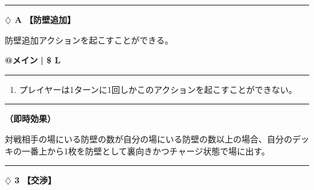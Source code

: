 \documentclass[twocolumn,a5paper,papersize,10pt]{jarticle}
\begin{document}
\vspace{3mm} %
\hrule height 0.5mm depth 0mm width 66.5mm %
\vspace{1mm} %
{\Large\bf $\diamondsuit$ A} {\normalsize\bf【防壁追加】} %
\vspace{1mm} %

防壁追加アクションを起こすことができる。

\begin{tcolorbox}[title={\small\bf【Action】防壁追加}{\scriptsize （通常魔法）}]

{\scriptsize\bf @メイン }
  {\scriptsize\bf | \$ L }

\vspace{1mm} %
\hrule height 0.1mm depth 0mm width 62mm %
\vspace{1mm} %


\vspace{-1zh}%
\begin{enumerate}
\renewcommand{\labelenumi}{※}
\setlength{\leftskip}{-0.3cm}
\setlength{\itemsep}{0pt} %
\setlength{\parskip}{0pt} %

\item プレイヤーは1ターンに1回しかこのアクションを起こすことができない。

\vspace{-3mm}%
\end{enumerate}
\vspace{-2mm} %
\vspace{1zh}%
\vspace{1mm} %
\hrule height 0.1mm depth 0mm width 62mm %
\vspace{1mm} %

{\bf（即時効果）}

対戦相手の場にいる防壁の数が自分の場にいる防壁の数以上の場合、自分のデッキの一番上から1枚を防壁として裏向きかつチャージ状態で場に出す。

\vspace{1mm} %
\end{tcolorbox}

\vspace{-1zh}

 
 
 
 
 

\vspace{3mm} %
\hrule height 0.5mm depth 0mm width 66.5mm %
\vspace{1mm} %
{\Large\bf $\diamondsuit$ 3} {\normalsize\bf【交渉】} %
\vspace{1mm} %
\end{document}
